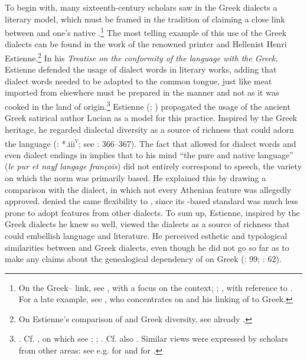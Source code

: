 To begin with, many sixteenth-century scholars saw in the Greek dialects a literary model, which must be framed in the tradition of claiming a close link between  and one’s native .\footnote{On the Greek– link, see \citet{Demaiziere1982}, with a focus on the  context; \citet{Trapp1990}; \citet{Dini2004}, with reference to . For a late example, see \citet[435--436]{VanHal2016}, who concentrates on \citet[119--132]{Reitz1730} and his linking of  to Greek.} The most telling example of this use of the Greek dialects can be found in the work of the renowned  printer and Hellenist Henri Estienne.\footnote{On Estienne’s comparison of  and Greek diversity, see already \citet[70]{Demaiziere1988}.} In his \textit{Treatise on the conformity of the  language with the Greek}, Estienne defended the usage of dialect words in  literary works, adding that dialect words needed to be adapted to the common  tongue, just like meat imported from elsewhere must be prepared in the  manner and not as it was cooked in the land of origin.\footnote{\citet[¶¶.ii\textsc{\textsuperscript{v}}]{Estienne1565}. Cf. \citet[\texttt{\char"2720}\textsc{\textsuperscript{r}}]{Ronsard1550}, on which see \citet[170]{Alinei1984}; \citet[24]{Barbier-mueller1990}; \citet[14]{Trapp1990}. Cf. also \citet[456, 458]{Mambrun1661}. Similar views were expressed by scholars from other areas: see e.g. \citet[\textsc{e.}iii\textsc{\textsuperscript{v}}–\textsc{e.}iv\textsc{\textsuperscript{r}}]{Oreadini1525} for  and \citet[\textsc{a}.vi\textsc{\textsuperscript{r}}]{Craige1606} for .} Estienne (\citeyear[133]{Estienne1579}; \citeyear[*.iii\textsc{\textsuperscript{v}}–*.iiii\textsc{\textsuperscript{r}}]{Estienne1582}) propagated the usage of the ancient Greek satirical author Lucian as a model for this practice. Inspired by the Greek heritage, he regarded  dialectal diversity as a source of richness that could adorn the  language (\citealt{Estienne1582}: *.iii\textsc{\textsuperscript{v}}; see \citealt{Auroux1992}: 366–367). The fact that \citet[143]{Estienne1579} allowed for dialect words and even dialect endings in  implies that to his mind “the pure and native  language” (\textit{le pur et nayf langage françois}) did not entirely correspond to  speech, the variety on which the  norm was primarily based. He explained this by drawing a comparison with the  dialect, in which not every Athenian feature was allegedly approved. \citet[133--134]{Estienne1579} denied the same flexibility to , since its -based standard was much less prone to adopt features from other dialects. To sum up, Estienne, inspired by the Greek dialects he knew so well, viewed the  dialects as a source of richness that could embellish  language and literature. He perceived esthetic and typological similarities between  and Greek dialects, even though he did not go so far as to make any claims about the genealogical dependency of  on Greek (\citealt{Droixhe1978}: 99; \citealt{Considine2008a}: 62).


